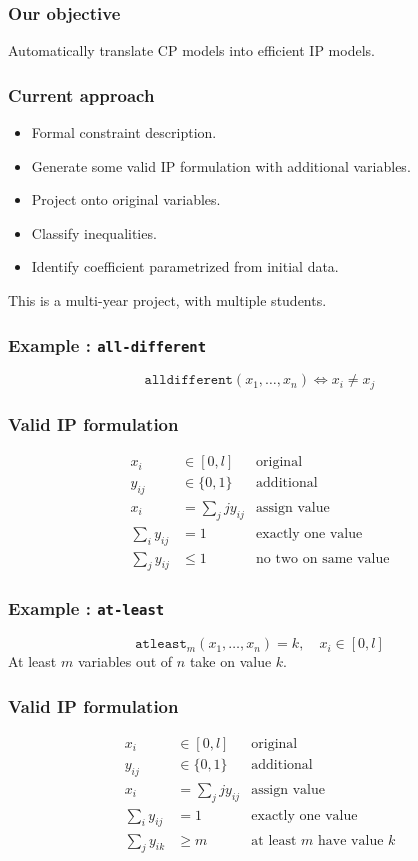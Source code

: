 \documentclass{beamer}
\begin{document}
\begin{frame}
  \frametitle{Our objective}
  Automatically translate CP models into efficient IP models.
\end{frame}

\begin{frame}
  \frametitle{Current approach}
  \begin{itemize}
  \item<1-> Formal constraint description.
  \item<2-> Generate some valid IP formulation with additional variables.
  \item<3-> Project onto original variables.
  \item<4-> Classify inequalities.
  \item<5-> Identify coefficient parametrized from initial data.
  \end{itemize}
  This is a multi-year project, with multiple students.
\end{frame}

\begin{frame}
  \frametitle{Example : \texttt{all-different}}
  \begin{displaymath}
    \mathtt{alldifferent}(x_1, \ldots, x_n) \Leftrightarrow x_i \ne x_j
  \end{displaymath}
\end{frame}

\begin{frame}
  \frametitle{Valid IP formulation}
  \begin{align*}
    x_i &\in [0,l]&\text{original}\\
    y_{ij} &\in \{0, 1\}&\text{additional}\\
    x_i &= \sum_j j y_{ij}&\text{assign value}\\
    \sum_i y_{ij} &= 1 & \text{exactly one value}\\
    \sum_j y_{ij} &\le 1&\text{no two on same value}
  \end{align*}
\end{frame}


\begin{frame}
  \frametitle{Example : \texttt{at-least}}
  \begin{displaymath}
    \mathtt{atleast}_m(x_1, \ldots, x_n)=k , \quad x_i\in[0,l]
  \end{displaymath}
  At least $m$ variables out of $n$ take on value $k$.
\end{frame}

\begin{frame}
  \frametitle{Valid IP formulation}
  \begin{align*}
    x_i &\in [0,l]&\text{original}\\
    y_{ij} &\in \{0, 1\}&\text{additional}\\
    x_i &= \sum_j j y_{ij}&\text{assign value}\\
    \sum_i y_{ij} &= 1 & \text{exactly one value}\\
    \sum_j y_{ik} &\ge m&\text{at least $m$ have value $k$}
  \end{align*}
\end{frame}
\end{document}
